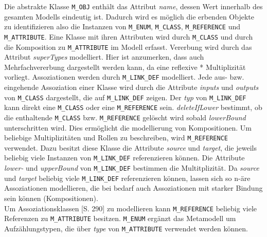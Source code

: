 Die abstrakte Klasse \texttt{M\_OBJ} enth\"alt das Attribut \textit{name}, dessen Wert innerhalb des gesamten Modells eindeutig ist. Dadurch wird es m\"oglich die erbenden Objekte zu identifizieren also die Instanzen von \texttt{M\_ENUM}, \texttt{M\_CLASS}, \texttt{M\_REFERENCE} und \texttt{M\_ATTRIBUTE}.
Eine Klasse mit ihren Attributen wird durch \texttt{M\_CLASS} und durch die Komposition zu \texttt{M\_ATTRIBUTE} im Modell erfasst. Vererbung wird durch das Attribut \textit{superTypes} modelliert. Hier ist anzumerken, dass auch Mehrfachvererbung dargestellt werden kann, da eine reflexive * Multiplizität vorliegt. 
Assoziationen werden durch \texttt{M\_LINK\_DEF} modelliert. Jede aus- bzw. eingehende Assoziation einer Klasse wird durch die Attribute \textit{inputs} und \textit{outputs} von \texttt{M\_CLASS} dargestellt, die auf \texttt{M\_LINK\_DEF} zeigen. Der \textit{typ} von \texttt{M\_LINK\_DEF} kann direkt eine \texttt{M\_CLASS} oder eine \texttt{M\_REFERENCE} sein. \textit{deleteIfLower} bestimmt, ob die enthaltende \texttt{M\_CLASS} bzw. \texttt{M\_REFERENCE} gel\"oscht wird sobald \textit{lowerBound} unterschritten wird. Dies erm\"oglicht die modellierung von Kompositionen. Um beliebige Multiplizitäten und Rollen zu beschreiben, wird \texttt{M\_REFERENCE} verwendet. Dazu besitzt diese Klasse die Attribute \textit{source} und \textit{target}, die jeweils beliebig viele Instanzen von \texttt{M\_LINK\_DEF} referenzieren können. Die Attribute \textit{lower-} und \textit{upperBound} von \texttt{M\_LINK\_DEF} bestimmen die Multitplizität. Da \textit{source} und \textit{target} beliebig viele \texttt{M\_LINK\_DEF} referenzieren k\"onnen, lassen sich so n-\"are Assoziationen modellieren, die bei bedarf auch Assoziationen mit starker Bindung sein k\"onnen (Kompositionen).\\
Um Assoziationsklassen \cite{larman2005book}[S. 290] zu modellieren kann \texttt{M\_\-REF\-ER\-ENCE} beliebig viele Referenzen zu \texttt{M\_AT\-TRI\-BUTE} besitzen. \texttt{M\_ENUM} erg\"anzt das Metamodell um Aufz\"ahlungstypen, die \"uber \textit{type} von \texttt{M\_ATTRIBUTE} verwendet werden k\"onnen.\\
